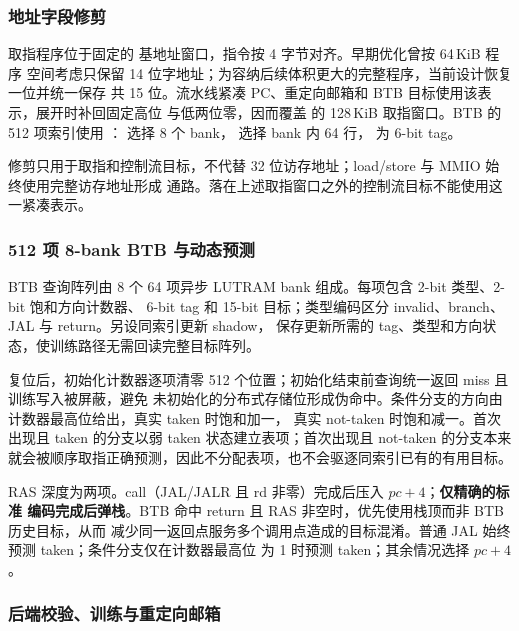 \subsubsection{地址字段修剪}

取指程序位于固定的  基地址窗口，指令按 4 字节对齐。早期优化曾按 64\,KiB 程序
空间考虑只保留 14 位字地址；为容纳后续体积更大的完整程序，当前设计恢复一位并统一保存
 共 15 位。流水线紧凑 PC、重定向邮箱和 BTB 目标使用该表示，展开时补回固定高位
与低两位零，因而覆盖  的 128\,KiB 取指窗口。BTB 的 512 项索引使用
： 选择 8 个 bank，
 选择 bank 内 64 行， 为 6-bit tag。



修剪只用于取指和控制流目标，不代替 32 位访存地址；load/store 与 MMIO 始终使用完整访存地址形成
通路。落在上述取指窗口之外的控制流目标不能使用这一紧凑表示。

\subsubsection{512 项 8-bank BTB 与动态预测}

BTB 查询阵列由 8 个 64 项异步 LUTRAM bank 组成。每项包含 2-bit 类型、2-bit 饱和方向计数器、
6-bit tag 和 15-bit 目标；类型编码区分 invalid、branch、JAL 与 return。另设同索引更新 shadow，
保存更新所需的 tag、类型和方向状态，使训练路径无需回读完整目标阵列。



复位后，初始化计数器逐项清零 512 个位置；初始化结束前查询统一返回 miss 且训练写入被屏蔽，避免
未初始化的分布式存储位形成伪命中。条件分支的方向由计数器最高位给出，真实 taken 时饱和加一，
真实 not-taken 时饱和减一。首次出现且 taken 的分支以弱 taken 状态建立表项；首次出现且 not-taken
的分支本来就会被顺序取指正确预测，因此不分配表项，也不会驱逐同索引已有的有用目标。

RAS 深度为两项。call（JAL/JALR 且 rd 非零）完成后压入 $pc+4$；\textbf{仅精确的标准
 编码完成后弹栈}。BTB 命中 return 且 RAS 非空时，优先使用栈顶而非 BTB 历史目标，从而
减少同一返回点服务多个调用点造成的目标混淆。普通 JAL 始终预测 taken；条件分支仅在计数器最高位
为 1 时预测 taken；其余情况选择 $pc+4$。



\subsubsection{后端校验、训练与重定向邮箱}

